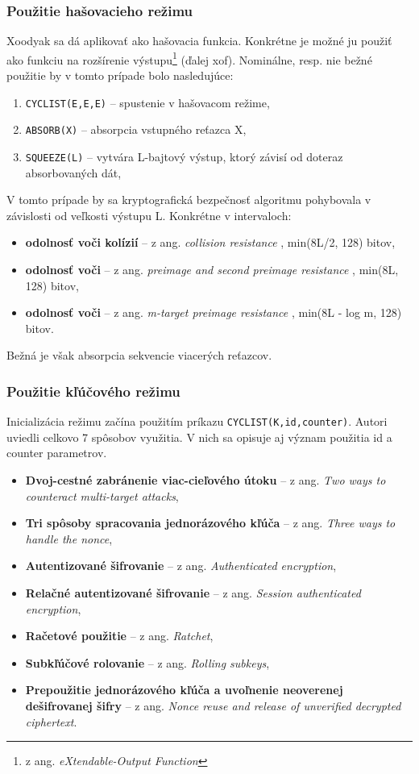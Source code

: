 \subsubsection{Použitie hašovacieho režimu}
Xoodyak sa dá aplikovať ako hašovacia funkcia. Konkrétne je možné ju použiť ako funkciu na rozšírenie výstupu\footnote{z ang. \textit{eXtendable-Output Function}} (ďalej \acrshort{xof}). Nominálne, resp. nie bežné použitie by v tomto prípade bolo nasledujúce: 
\begin{enumerate}
	\item \lstinline|CYCLIST(E,E,E)| -- spustenie v hašovacom režime,
 	\item \lstinline|ABSORB(X)| -- absorpcia vstupného reťazca X,
 	\item \lstinline|SQUEEZE(L)| -- vytvára L-bajtový výstup, ktorý závisí od doteraz absorbovaných dát,
\end{enumerate}
V tomto prípade by sa kryptografická bezpečnosť algoritmu pohybovala v závislosti od veľkosti výstupu L. Konkrétne v intervaloch:
\begin{itemize}
	\item{\textbf{odolnosť voči kolízií}} -- z ang. \textit{collision resistance} \cite{cr}, min(8L/2, 128) bitov,
	\item{\textbf{odolnosť voči }} -- z ang. \textit{preimage and second preimage resistance} \cite{pa}, min(8L, 128) bitov,
	\item{\textbf{odolnosť voči}} -- z ang. \textit{m-target preimage resistance} \cite{pa}, min(8L - log m, 128) bitov.
\end{itemize}
Bežná je však absorpcia sekvencie viacerých reťazcov.

\subsubsection{Použitie kľúčového režimu}
Inicializácia režimu začína použitím príkazu \lstinline|CYCLIST(K,id,counter)|. Autori uviedli celkovo 7 spôsobov využitia. V nich sa opisuje aj význam použitia id a counter parametrov.
\begin{itemize}
	\item{\textbf{Dvoj-cestné zabránenie viac-cieľového útoku}} -- z ang. \textit{Two ways to counteract multi-target attacks},
	\item{\textbf{Tri spôsoby spracovania jednorázového kľúča}} -- z ang. \textit{Three ways to handle the nonce},
	\item{\textbf{Autentizované šifrovanie}} -- z ang. \textit{Authenticated encryption},
	\item{\textbf{Relačné autentizované šifrovanie}} -- z ang. \textit{Session authenticated encryption},
	\item{\textbf{Račetové použitie}} -- z ang. \textit{Ratchet},
	\item{\textbf{Subkľúčové rolovanie}} -- z ang. \textit{Rolling subkeys},
	\item{\textbf{Prepoužitie jednorázového kľúča a uvoľnenie neoverenej dešifrovanej šifry}} -- z ang. \textit{Nonce reuse and release of unverified decrypted ciphertext}.
\end{itemize}

